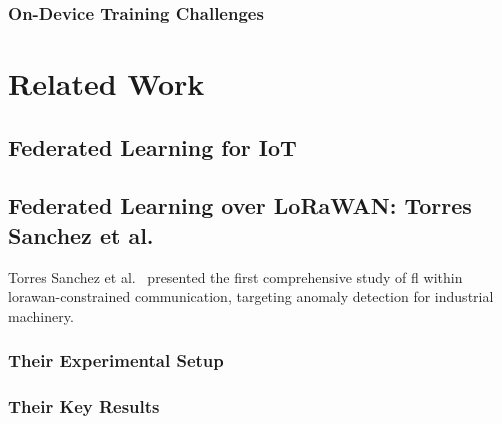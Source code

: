 \documentclass[12pt, a4paper, twoside, openright]{report}
\begin{document}
\subsection{On-Device Training Challenges}


\chapter{Related Work}
\label{ch:related-work}

\section{Federated Learning for IoT}
\label{sec:fl-iot}

\section{Federated Learning over LoRaWAN: Torres Sanchez et al.}
\label{sec:torres-sanchez}

Torres Sanchez et al.~\cite{torressanchez2024federated} presented the first comprehensive study of \gls{fl} within \gls{lorawan}-constrained communication, targeting anomaly detection for industrial machinery.

\subsection{Their Experimental Setup}

\subsection{Their Key Results}
\end{document}
